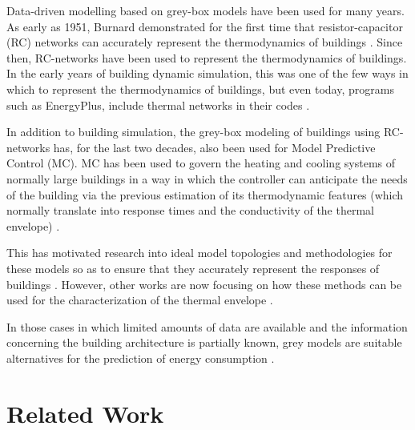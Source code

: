 \documentclass[10pt, conference, compsocconf]{IEEEtran}
\begin{document}
Data-driven modelling based on grey-box models have been used for many years. As early as 1951, Burnard demonstrated for the first time that resistor-capacitor (RC) networks can accurately represent the thermodynamics of buildings \cite{burnand1952study}. Since then, RC-networks have been used to represent the thermodynamics of buildings. In the early years of building dynamic simulation, this was one of the few ways in which to represent the thermodynamics of buildings, but even today, programs such as EnergyPlus, include thermal networks in their codes \cite{handbook2017american} .

In addition to building simulation, the grey-box modeling of buildings using RC-networks has,  for the last two decades, also  been used for Model Predictive Control (MC). MC has been used to govern the heating and cooling systems of normally large buildings in a way in which the controller can anticipate the needs of the building via the previous estimation of its thermodynamic features (which normally translate into response times and the conductivity of the thermal envelope) \cite{coley1992second}.

This has motivated research into ideal model topologies and methodologies for these models so as to ensure that they accurately represent the responses of buildings \cite{bacher2011identifying}. However, other works are now focusing on how these methods can be used for the characterization of the thermal envelope \cite{ramallo2017reliability}.

In those cases in which limited amounts of data are available and the information concerning the building architecture is partially known, grey models are suitable alternatives for the prediction of energy consumption \cite{hamzacebi2014forecasting}.











\section{Related Work}
\end{document}
